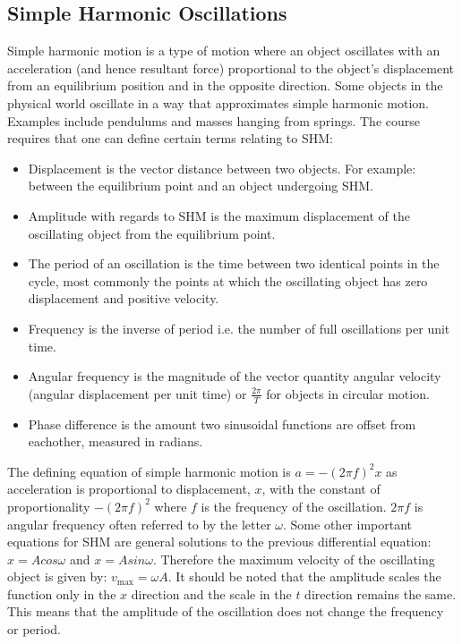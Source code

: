 \documentclass[a4,8pt]{article}
\begin{document}
\subsection{Simple Harmonic Oscillations}
Simple harmonic motion is a type of motion where an object oscillates with an
acceleration (and hence resultant force) proportional to the object's
displacement from an equilibrium position and in the opposite direction. Some
objects in the physical world oscillate in a way that approximates simple
harmonic motion. Examples include pendulums and masses hanging from springs. The
course requires that one can define certain terms relating to SHM:\@
\begin{itemize}
	\item Displacement is the vector distance between two objects. For
          example: between the equilibrium point and an object undergoing SHM.\@
	\item Amplitude with regards to SHM is the maximum displacement of the
          oscillating object from the equilibrium point.
	\item The period of an oscillation is the time between two identical
          points in the cycle, most commonly the points at which the oscillating
          object has zero displacement and positive velocity.
	\item Frequency is the inverse of period i.e. the number of full
          oscillations per unit time.
	\item Angular frequency is the magnitude of the vector quantity angular
          velocity (angular displacement per unit time) or $\frac{2\pi}{T}$ for
          objects in circular motion.
	\item Phase difference is the amount two sinusoidal functions are offset
          from eachother, measured in radians.
\end{itemize}

The defining equation of simple harmonic motion is $a=-{(2\pi f)}^2 x$ as
acceleration is proportional to displacement, $x$, with the constant of
proportionality $-{(2\pi f)}^2$ where $f$ is the frequency of the oscillation.
$2\pi f$ is angular frequency often referred to by the letter $\omega$. Some
other important equations for SHM are general solutions to the previous
differential equation: $x=Acos\omega$ and $x=Asin\omega$. Therefore the maximum
velocity of the oscillating object is given by: $v_\text{max}=\omega A$. It
should be noted that the amplitude scales the function only in the $x$ direction
and the scale in the $t$ direction remains the same. This means that the
amplitude of the oscillation does not change the frequency or period.
\vspace{8pt}
\end{document}
